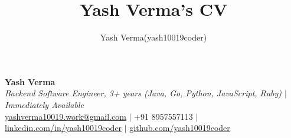 \documentclass[letterpaper,10pt]{article}
\title{Yash Verma's CV}
\author{Yash Verma(yash10019coder)}
\begin{document}

\begin{center}
{\large \bf Yash Verma}\\
\textit{Backend Software Engineer, 3+ years (Java, Go, Python, JavaScript, Ruby) $|$ Immediately Available}\\
\href{mailto:yashverma10019.work@gmail.com}{yashverma10019.work@gmail.com} $|$ +91 8957557113 $|$ \href{https://linkedin.com/in/yash10019coder}{linkedin.com/in/yash10019coder} $|$ \href{https://github.com/yash10019coder}{github.com/yash10019coder}
\end{center}


\end{document}

